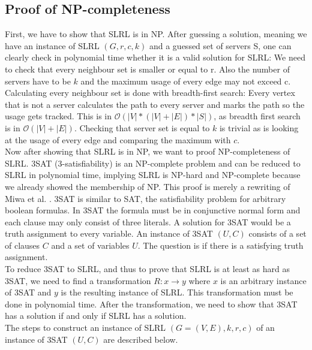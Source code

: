 \documentclass [12pt]{article}
\begin{document}
\subsection{Proof of NP-completeness}
First, we have to show that SLRL is in NP. After guessing a solution, meaning we 
have an instance of SLRL $(G,r,c,k)$ and a guessed set of servers S, one can clearly check 
in polynomial time whether it is a valid solution for SLRL: We need to check that every neighbour set is smaller
or equal to r. Also the number of servers have to be $k$ and the maximum usage of every edge may not exceed c.
Calculating every neighbour set is done with breadth-first search: Every vertex that is not a server calculates
the path to every server and marks the path so the usage gets tracked. This is in $\mathcal{O}(|V|*(|V|+|E|)*|S|)$, as breadth first
search is in $\mathcal{O}(|V|+|E|)$. Checking that server set is equal to $k$ is trivial as is looking at the usage of
every edge and comparing the maximum with $c$.\\
Now after showing that SLRL is in NP, we want to proof NP-completeness of SLRL.
3SAT (3-satisfiability) is an NP-complete problem \cite{Garey:1979:CIG:578533} and can be reduced to SLRL in polynomial time,
implying SLRL is NP-hard and NP-complete because we already showed the membership of NP. 
This proof is merely a rewriting of Miwa et al. \cite{mirrorserver}.
3SAT is similar to SAT, the satisfiability problem for arbitrary boolean formulas. In 3SAT the formula must be in conjunctive normal form and 
each clause may only consist of three literals. A solution for 3SAT would be a truth assignment to every
variable. An instance of 3SAT $(U,C)$ consists of a set of clauses $C$ and a set of variables $U$. The question is if there is a satisfying
truth assignment.\\
To reduce 3SAT to SLRL, and thus to prove that SLRL is at least as hard as 3SAT, we need to find a 
transformation $R: x \rightarrow y$ where $x$ is an arbitrary instance of 3SAT and $y$ is the resulting instance of SLRL. This transformation must be 
done in polynomial time. After the transformation, we need to show that 3SAT has a solution if and only if 
SLRL has a solution.\\
The steps to construct an instance of SLRL $(G=(V,E),k,r,c)$ of an instance of 3SAT $(U,C)$ are described below.
\end{document}
